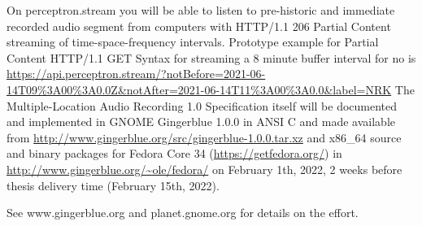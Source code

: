 \documentclass[a4paper]{article}
\begin{document}
On perceptron.stream you will be able to listen to pre-historic and immediate recorded audio segment from computers with HTTP/1.1 206 Partial Content streaming of time-space-frequency intervals.   Prototype example for Partial Content HTTP/1.1 GET Syntax for streaming a 8 minute buffer interval for no is \url{https://api.perceptron.stream/?notBefore=2021-06-14T09%3A00%3A0.0Z&notAfter=2021-06-14T11%3A00%3A0.0&label=NRK}
The Multiple-Location Audio Recording 1.0 Specification itself will be documented and implemented in GNOME Gingerblue 1.0.0 in ANSI C and made available from \url{http://www.gingerblue.org/src/gingerblue-1.0.0.tar.xz} and x86\_64 source and binary packages for Fedora Core 34 (\url{https://getfedora.org/}) in \url{http://www.gingerblue.org/~ole/fedora/} on February 1th, 2022, 2 weeks before thesis delivery time (February 15th, 2022).

See www.gingerblue.org and planet.gnome.org for details on the effort.
\end{document}
